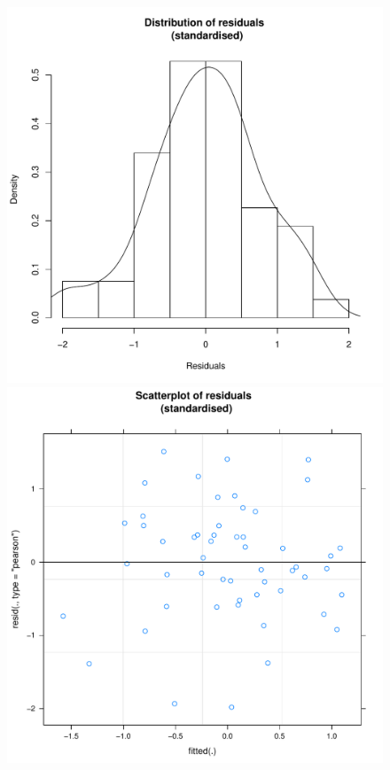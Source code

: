 \begin{figure}[htbp]
    \includegraphics[scale =.4]{images/TEM21Hist.pdf}
    \includegraphics[scale =.4]{images/TEM21Scatter.pdf}

\end{figure}
